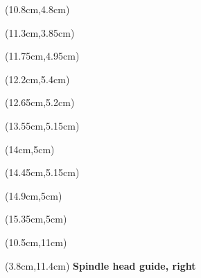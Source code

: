 \begin{textblock*}{3cm}(10.8cm,4.8cm)
    {}
\end{textblock*}

\begin{textblock*}{3cm}(11.3cm,3.85cm)
    {}
\end{textblock*}

\begin{textblock*}{3cm}(11.75cm,4.95cm)
    {}
\end{textblock*}

\begin{textblock*}{3cm}(12.2cm,5.4cm)
    {}
\end{textblock*}

\begin{textblock*}{3cm}(12.65cm,5.2cm)
    {}
\end{textblock*}

\begin{textblock*}{3cm}(13.55cm,5.15cm)
    {}
\end{textblock*}

\begin{textblock*}{3cm}(14cm,5cm)
    {}
\end{textblock*}

\begin{textblock*}{3cm}(14.45cm,5.15cm)
    {}
\end{textblock*}

\begin{textblock*}{3cm}(14.9cm,5cm)
    {}
\end{textblock*}

\begin{textblock*}{3cm}(15.35cm,5cm)
    {}
\end{textblock*}

\begin{textblock*}{3cm}(10.5cm,11cm)
    {}
    {}
\end{textblock*}

\begin{textblock*}{5cm}(3.8cm,11.4cm)
    \textbf{Spindle head guide, right}
\end{textblock*}

